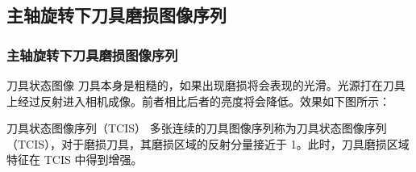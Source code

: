 \documentclass[aspectratio=169,t,xcolor=table,10pt]{ctexbeamer}
\numberwithin{equation}{section} %
\begin{document}
	\subsection{主轴旋转下刀具磨损图像序列}
	\begin{frame}
		\frametitle{主轴旋转下刀具磨损图像序列}
		\begin{block}{刀具状态图像}
			\qquad 刀具本身是粗糙的，如果出现磨损将会表现的光滑。光源打在刀具上经过反射进入相机成像。前者相比后者的亮度将会降低。效果如下图所示：
			\begin{figure}[H]
				\centering
				\hspace*{2pt}
			\end{figure}
		\end{block}
		\begin{block}{刀具状态图像序列（TCIS）}
			\qquad 多张连续的刀具图像序列称为刀具状态图像序列（TCIS），对于磨损刀具，其磨损区域的反射分量接近于 1。此时，刀具磨损区域特征在 TCIS 中得到增强。
		\end{block}
	\end{frame}
\end{document}
